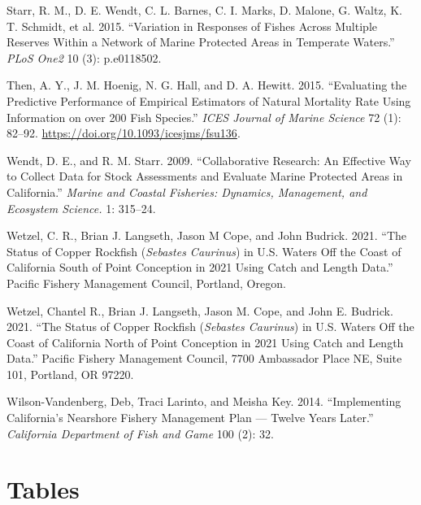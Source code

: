 \documentclass[11pt,
  english,
  letterpaper,
]{article}
\newlength{\cslhangindent}
\newenvironment{CSLReferences}[2] %
 {%
  \setlength{\parindent}{0pt}
  \ifodd #1 \everypar{\setlength{\hangindent}{\cslhangindent}}\ignorespaces\fi
  \ifnum #2 > 0
  \setlength{\parskip}{#2\baselineskip}
  \fi
 }%
 {}
\begin{document}
\begin{CSLReferences}{1}{0}
\leavevmode{}%
Starr, R. M., D. E. Wendt, C. L. Barnes, C. I. Marks, D. Malone, G. Waltz, K. T. Schmidt, et al. 2015. {``Variation in Responses of Fishes Across Multiple Reserves Within a Network of Marine Protected Areas in Temperate Waters.''} \emph{PLoS One2} 10 (3): p.e0118502.

\leavevmode{}%
Then, A. Y., J. M. Hoenig, N. G. Hall, and D. A. Hewitt. 2015. {``Evaluating the Predictive Performance of Empirical Estimators of Natural Mortality Rate Using Information on over 200 Fish Species.''} \emph{ICES Journal of Marine Science} 72 (1): 82--92. \url{https://doi.org/10.1093/icesjms/fsu136}.

\leavevmode{}%
Wendt, D. E., and R. M. Starr. 2009. {``Collaborative Research: An Effective Way to Collect Data for Stock Assessments and Evaluate Marine Protected Areas in {C}alifornia.''} \emph{Marine and Coastal Fisheries: Dynamics, Management, and Ecosystem Science.} 1: 315--24.

\leavevmode{}%
Wetzel, C. R., Brian J. Langseth, Jason M Cope, and John Budrick. 2021. {``The Status of Copper Rockfish (\emph{{Sebastes} Caurinus}) in {U}.{S}. Waters Off the Coast of {California} South of {Point} {Conception} in 2021 Using Catch and Length Data.''} Pacific Fishery Management Council, Portland, Oregon.

\leavevmode{}%
Wetzel, Chantel R., Brian J. Langseth, Jason M. Cope, and John E. Budrick. 2021. {``The Status of Copper Rockfish (\emph{{Sebastes} Caurinus}) in {U}.{S}. Waters Off the Coast of {California} North of {Point} {Conception} in 2021 Using Catch and Length Data.''} Pacific Fishery Management Council, 7700 Ambassador Place NE, Suite 101, Portland, OR 97220.

\leavevmode{}%
Wilson-Vandenberg, Deb, Traci Larinto, and Meisha Key. 2014. {``Implementing {California}'s {Nearshore} {Fishery} {Management} {Plan} --- Twelve Years Later.''} \emph{California Department of Fish and Game} 100 (2): 32.

\end{CSLReferences}

\clearpage

\hypertarget{tables}{%
\section{Tables}\label{tables}}
\end{document}
